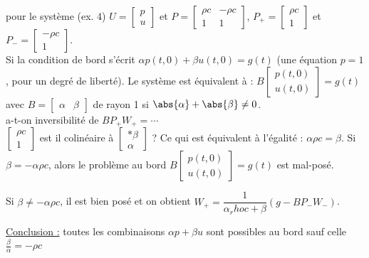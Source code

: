 \documentclass[12pt,a4paper]{article}
\begin{document}
	\begin{ex}
		\begin{minipage}[t]{15.5cm}
			pour le système (ex. 4) $U = \begin{bmatrix}
				p \\
				u
			\end{bmatrix}$ et $P = \begin{bmatrix}
				\rho c & - \rho c \\
				1 & 1
			\end{bmatrix}$, $P_+ = \begin{bmatrix}
				\rho c \\
				1
			\end{bmatrix}$ et $P_- = \begin{bmatrix}
				-\rho c \\
				1
			\end{bmatrix}$.\\
			Si la condition de bord s'écrit $\alpha p(t,0) + \beta u(t,0) = g(t)$ (une équation $p=1$, pour un degré de liberté). Le système est équivalent à : $B\begin{bmatrix}
				p(t,0) \\
				u(t,0)
			\end{bmatrix} = g(t)$ avec $B = \begin{bmatrix}
				\alpha & \beta
			\end{bmatrix}$ de rayon 1 si $\abs{\alpha}+\abs{\beta} \not = 0$.\\
			a-t-on  inversibilité de $BP_+W_+ = \cdots$\\
			$\begin{bmatrix}
				\rho c\\
				1
			\end{bmatrix}$ est il colinéaire à $\begin{bmatrix}
				*\beta \\
				\alpha
			\end{bmatrix}$ ?
			Ce qui est équivalent à l'égalité : $\alpha\rho  c = \beta$. Si $\beta = -\alpha\rho c$, alors le problème au bord $B\begin{bmatrix}
				p(t,0) \\
				u(t,0)
			\end{bmatrix} = g(t)$ est mal-posé.
			
			Si $\beta \not = -\alpha\rho c$, il est bien posé et on obtient $W_+ = \dfrac1{\alpha_rho c + \beta} (g-BP_-W_-)$.
			
			\underline{Conclusion :} toutes les combinaisons $\alpha p + \beta u$ sont possibles au bord sauf celle $\frac \beta\alpha = - \rho c$
		\end{minipage}
	\end{ex}
	
\end{document}
